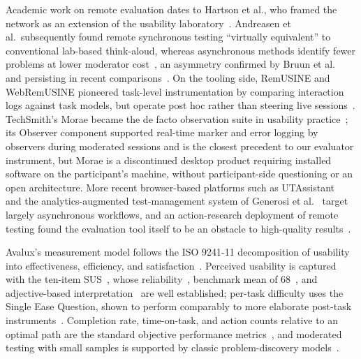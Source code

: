 Academic work on remote evaluation dates to Hartson et al., who framed the network as an extension of the usability laboratory~\cite{hartson1996remote}. Andreasen et al.\ subsequently found remote synchronous testing ``virtually equivalent'' to conventional lab-based think-aloud, whereas asynchronous methods identify fewer problems at lower moderator cost~\cite{andreasen2007remote}, an asymmetry confirmed by Bruun et al.~\cite{bruun2009asynchronous} and persisting in recent comparisons~\cite{alhadreti2022comparison}. On the tooling side, RemUSINE and WebRemUSINE pioneered task-level instrumentation by comparing interaction logs against task models, but operate post hoc rather than steering live sessions~\cite{paterno2000remusine,paganelli2003webremusine}. TechSmith's Morae became the de facto observation suite in usability practice~\cite{techsmith2004morae,bastien2010usability}; its Observer component supported real-time marker and error logging by observers during moderated sessions and is the closest precedent to our evaluator instrument, but Morae is a discontinued desktop product requiring installed software on the participant's machine, without participant-side questioning or an open architecture. More recent browser-based platforms such as UTAssistant~\cite{desolda2017utassistant,federici2018utassistant} and the analytics-augmented test-management system of Generosi et al.~\cite{generosi2022test} target largely asynchronous workflows, and an action-research deployment of remote testing found the evaluation tool itself to be an obstacle to high-quality results~\cite{pedersen2021asynchronous}.

Avalux's measurement model follows the ISO 9241-11 decomposition of usability into effectiveness, efficiency, and satisfaction~\cite{iso2018usability}. Perceived usability is captured with the ten-item SUS~\cite{brooke1996sus}, whose reliability~\cite{bangor2008empirical,lewis2018sus}, benchmark mean of 68~\cite{sauro2011practical}, and adjective-based interpretation~\cite{bangor2009determining} are well established; per-task difficulty uses the Single Ease Question, shown to perform comparably to more elaborate post-task instruments~\cite{sauro2009comparison}. Completion rate, time-on-task, and action counts relative to an optimal path are the standard objective performance metrics~\cite{albert2022measuring,sauro2016quantifying}, and moderated testing with small samples is supported by classic problem-discovery models~\cite{virzi1992refining,nielsen1993mathematical}.

